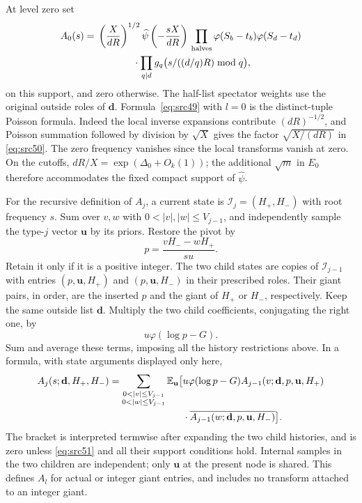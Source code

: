 At level zero set
\begin{equation}
 \begin{split}
 A_0(s)={}&\left(\frac{X}{dR}\right)^{1/2}
             \widehat\psi\left(-\frac{sX}{dR}\right)\,
       \prod_{\rm halves}\varphi(S_b-t_b)\varphi(S_d-t_d)\\
 &\hspace{13mm}\cdot
       \prod_{q\mid d}
          g_q\bigl(s/((d/q)R)\bmod q\bigr),
 \end{split}
 \label{eq:src50}
\end{equation}
on this support, and zero otherwise.  The half-list spectator
weights use the original outside roles of $\mathbf d$.
Formula~\eqref{eq:src49} with $l=0$ is the distinct-tuple Poisson
formula.  Indeed the local inverse expansions contribute
$(dR)^{-1/2}$, and Poisson summation followed by division by
$\sqrt X$ gives the factor $\sqrt{X/(dR)}$ in
\eqref{eq:src50}.  The zero frequency vanishes since the local
transforms vanish at zero.  On the cutoffs,
$dR/X=\exp(\Delta_0+O_k(1))$; the additional $\sqrt m$ in
$E_0$ therefore accommodates the fixed compact support of
$\widehat\psi$.

For the recursive definition of $A_j$, a current state is
$\mathcal I_j=(H_+,H_-)$ with root frequency $s$.
Sum over $v,w$ with $0<|v|,|w|\le V_{j-1}$, and independently sample
the type-$j$ vector $\mathbf u$ by its priors.  Restore the pivot by
\begin{equation}
                       p=\frac{vH_- - wH_+}{su}.
 \label{eq:src51}
\end{equation}
Retain it only if it is a positive integer.  The two child states
are copies of $\mathcal I_{j-1}$ with entries $(p,\mathbf u,H_+)$
and $(p,\mathbf u,H_-)$ in their prescribed roles.  Their giant
pairs, in order, are the inserted $p$ and the giant of $H_+$ or
$H_-$, respectively.  Keep the same outside list $\mathbf d$.
Multiply the two child coefficients, conjugating the right one,
by
\begin{equation}
                         u\varphi(\log p-G).
 \label{eq:src52}
\end{equation}
Sum and average these terms, imposing all the history restrictions
above.  In a formula, with state arguments displayed only here,
\begin{align*}
 A_j(s;\mathbf d,H_+,H_-)
   =\sum_{\substack{0<|v|\le V_{j-1}\\0<|w|\le V_{j-1}}}
       \E_{\mathbf u}\bigl[{}
       &u\varphi(\log p-G)
          A_{j-1}(v;\mathbf d,p,\mathbf u,H_+)\\
       &\cdot\overline{A_{j-1}(w;\mathbf d,p,\mathbf u,H_-)}
                              \bigr].
\end{align*}
The bracket is interpreted termwise after expanding the two child
histories, and is zero unless \eqref{eq:src51} and all their support
conditions hold.  Internal samples in the two children are
independent; only $\mathbf u$ at the present node is shared.
This defines $A_l$ for actual or integer giant entries, and includes
no transform attached to an integer giant.


